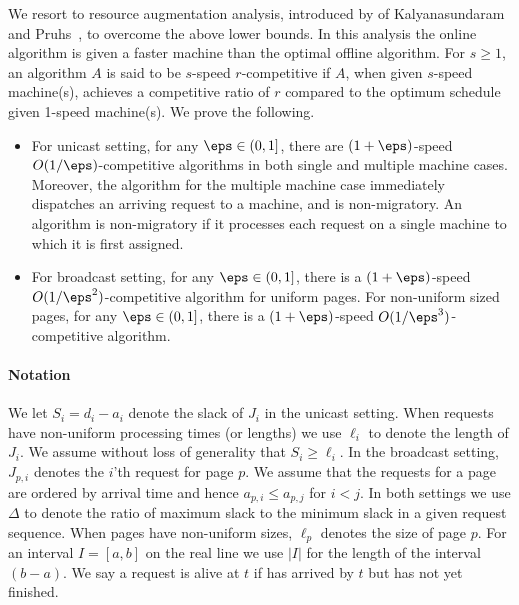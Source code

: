 We resort to resource augmentation analysis, introduced by of
Kalyanasundaram and Pruhs~\cite{KalyanasundaramP95}, to overcome the
above lower bounds. In this analysis the online algorithm is given a
faster machine than the optimal offline algorithm. For $s \ge 1$, an
algorithm $A$ is said to be $s$-speed $r$-competitive if $A$, when
given $s$-speed machine(s), achieves a competitive ratio of $r$
compared to the optimum  schedule given 1-speed machine(s).
We prove the following.
\begin{itemize}
\item For unicast setting, for any $\eps \in (0,1]$, there are
  $(1+\eps)$-speed $O(1/\eps)$-competitive algorithms in both single
  and multiple machine cases. Moreover, the algorithm for the multiple
  machine case immediately dispatches an arriving request to a
  machine, and is non-migratory. An algorithm is non-migratory
  if it processes each request on a single machine to which it is
  first assigned.

\item For broadcast setting, for any $\eps \in (0,1]$, there is a
  $(1+\eps)$-speed $O(1/\eps^2)$-competitive algorithm for uniform
  pages.  For non-uniform sized pages, for any $\eps \in (0,1]$, there
  is a $(1+\eps)$-speed $O(1/\eps^3)$-competitive algorithm.
\end{itemize}

\paragraph{Notation}
We let $S_i = d_i - a_i$ denote the slack of $J_i$ in the unicast
setting. When requests have non-uniform processing times (or lengths) we
use $\ell_i$ to denote the length of $J_i$. We assume without loss
of generality that $S_i \ge \ell_i$. In the broadcast setting,
$J_{p,i}$ denotes the $i$'th request for page $p$. We assume that the
requests for a page are ordered by arrival time and hence $a_{p,i}
\le a_{p,j}$ for $i < j$. In both settings we use $\Delta$ to denote
the ratio of maximum slack to the minimum slack in a given request
sequence. When pages have non-uniform sizes, $\ell_p$ denotes the size of page $p$.  For an interval $I = [a,b]$ on the real line we use $|I|$
for the length of the interval $(b-a)$. We say a request is alive
 at $t$ if has arrived by $t$ but has not yet finished.

